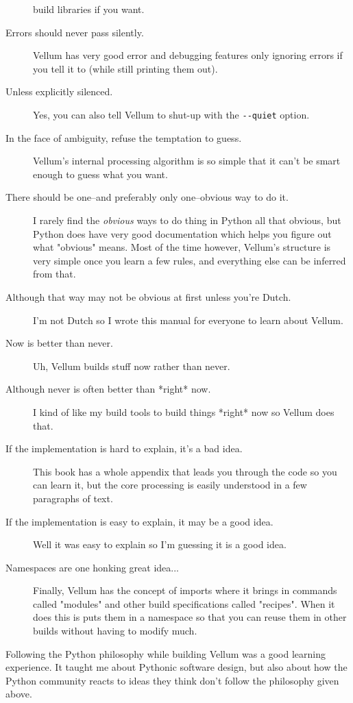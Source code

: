 \begin{description}
build libraries if you want.
\item [Errors should never pass silently.] Vellum has very good error and
debugging features only ignoring errors if you tell it to (while still printing
them out).
\item [Unless explicitly silenced.]  Yes, you can also tell Vellum to shut-up
with the \verb|--quiet| option.
\item [In the face of ambiguity, refuse the temptation to guess.]  Vellum's
internal processing algorithm is so simple that it can't be smart enough to
guess what you want.
\item [There should be one--and preferably only one--obvious way to do it.]  I
rarely find the \emph{obvious} ways to do thing in Python all that obvious, but
Python does have very good documentation which helps you figure out what "obvious"
means.  Most of the time however, Vellum's structure is very simple once you
learn a few rules, and everything else can be inferred from that.
\item [Although that way may not be obvious at first unless you're Dutch.]   I'm
not Dutch so I wrote this manual for everyone to learn about Vellum.
\item [Now is better than never.]  Uh, Vellum builds stuff now rather than
never.
\item [Although never is often better than *right* now.]  I kind of like my
build tools to build things *right* now so Vellum does that.
\item [If the implementation is hard to explain, it's a bad idea.]   This book
has a whole appendix that leads you through the code so you can learn it, but
the core processing is easily understood in a few paragraphs of text.
\item [If the implementation is easy to explain, it may be a good idea.]   Well
it was easy to explain so I'm guessing it is a good idea.
\item [Namespaces are one honking great idea...]  Finally, Vellum has the
concept of imports where it brings in commands called "modules" and other 
build specifications called "recipes".  When it does this is puts them in 
a namespace so that you can reuse them in other builds without having to
modify much.
\end{description}

Following the Python philosophy while building Vellum was a good learning
experience.  It taught me about Pythonic software design, but also about how the
Python community reacts to ideas they think don't follow the philosophy given
above.




